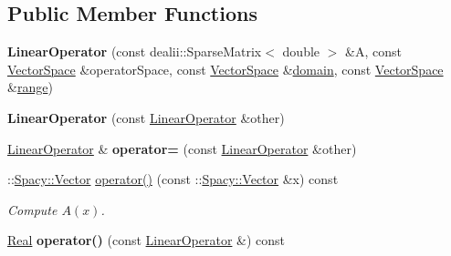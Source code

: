 \subsection*{\-Public \-Member \-Functions}
\begin{DoxyCompactItemize}
\item 
\hypertarget{classSpacy_1_1dealII_1_1LinearOperator_a6bd7cf0440ea448a145afbc5202ab81c}{{\bfseries \-Linear\-Operator} (const dealii\-::\-Sparse\-Matrix$<$ double $>$ \&\-A, const \hyperlink{classSpacy_1_1VectorSpace}{\-Vector\-Space} \&operator\-Space, const \hyperlink{classSpacy_1_1VectorSpace}{\-Vector\-Space} \&\hyperlink{classSpacy_1_1OperatorBase_a2588f9b3e0188820c4c494e63293dc6f}{domain}, const \hyperlink{classSpacy_1_1VectorSpace}{\-Vector\-Space} \&\hyperlink{classSpacy_1_1OperatorBase_ab19d3b7a6f290b1079248f1e567e53d6}{range})}\label{classSpacy_1_1dealII_1_1LinearOperator_a6bd7cf0440ea448a145afbc5202ab81c}

\item 
\hypertarget{classSpacy_1_1dealII_1_1LinearOperator_a18a77229674a6d7be21aee1e199734a7}{{\bfseries \-Linear\-Operator} (const \hyperlink{classSpacy_1_1dealII_1_1LinearOperator}{\-Linear\-Operator} \&other)}\label{classSpacy_1_1dealII_1_1LinearOperator_a18a77229674a6d7be21aee1e199734a7}

\item 
\hypertarget{classSpacy_1_1dealII_1_1LinearOperator_ae0ce5b35ba269b997f64dd483750aff9}{\hyperlink{classSpacy_1_1dealII_1_1LinearOperator}{\-Linear\-Operator} \& {\bfseries operator=} (const \hyperlink{classSpacy_1_1dealII_1_1LinearOperator}{\-Linear\-Operator} \&other)}\label{classSpacy_1_1dealII_1_1LinearOperator_ae0ce5b35ba269b997f64dd483750aff9}

\item 
\-::\hyperlink{classSpacy_1_1Vector}{\-Spacy\-::\-Vector} \hyperlink{classSpacy_1_1dealII_1_1LinearOperator_a5874d400fdc11be1a2f8f45d3d4969fa}{operator()} (const \-::\hyperlink{classSpacy_1_1Vector}{\-Spacy\-::\-Vector} \&x) const 
\begin{DoxyCompactList}\small\item\em \-Compute $A(x)$. \end{DoxyCompactList}\item 
\hypertarget{classSpacy_1_1dealII_1_1LinearOperator_a9adc85435d04c2da0e35e41690c41c08}{\hyperlink{classSpacy_1_1Real}{\-Real} {\bfseries operator()} (const \hyperlink{classSpacy_1_1dealII_1_1LinearOperator}{\-Linear\-Operator} \&) const }\label{classSpacy_1_1dealII_1_1LinearOperator_a9adc85435d04c2da0e35e41690c41c08}


\end{DoxyCompactItemize}
